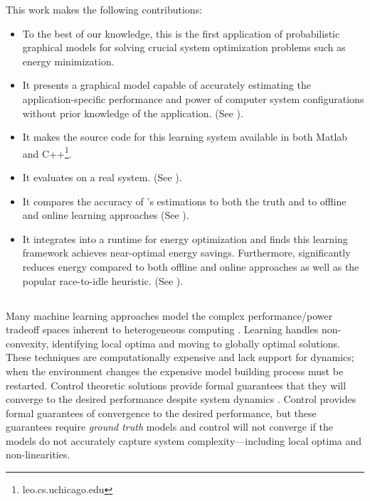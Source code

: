 This work makes the following contributions:
\begin{itemize}
\item To the best of our knowledge, this is the first application of
 probabilistic graphical models for solving crucial system
 optimization problems such as energy minimization.
\item It presents a graphical model capable of accurately
 estimating the application-specific performance and power of
 computer system configurations without prior knowledge of the
 application. (See ).
\item It makes the source code for this learning system available in
 both Matlab and C++\footnote{leo.cs.uchicago.edu}.
\item It evaluates \SYSTEMLEO{} on a real system. (See
 ).
\item It compares the accuracy of \SYSTEMLEO{}'s estimations to both the
 truth and to offline and online learning approaches (See
 ).
\item It integrates \SYSTEMLEO{} into a runtime for energy optimization
 and finds this learning framework achieves near-optimal energy
 savings.  Furthermore, \SYSTEMLEO{} significantly reduces energy
 compared to both offline and online approaches as well as the
 popular race-to-idle heuristic.  (See
 ).
\end{itemize}

\subsection{\SYSTEM{}}
Many machine learning approaches model the complex performance/power
tradeoff spaces inherent to heterogeneous computing
\cite{reddiHPCA2013,dubach2010,Bitirgen2008,Koala,LEO,Flicker,Ponamarev,Paragon}.
Learning handles non-convexity, identifying local optima and moving to
globally optimal solutions. These techniques are computationally
expensive and lack support for dynamics; \ie{} when the environment
changes the expensive model building process must be restarted.
Control theoretic solutions provide formal guarantees that they will
converge to the desired performance despite system dynamics
\cite{Hellerstein2004a,Chen2011,POET,ControlWare,Agilos,grace2,JouleGuard}.
Control provides formal guarantees of convergence to the desired
performance, but these guarantees require \emph{ground truth} models
and control will not converge if the models do not accurately capture
system complexity---including local optima and non-linearities.

